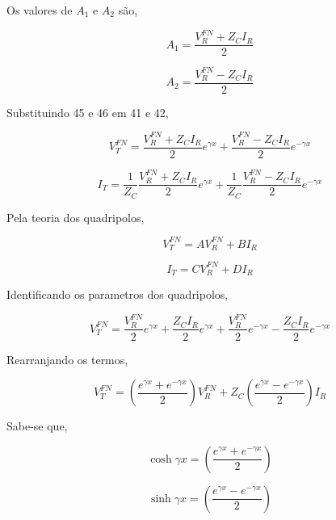 \documentclass[a4paper, 10pt]{article}
\begin{document}
Os valores de $A_1$ e $A_2$ são,

\begin{equation}
A_1 = \frac{V_R^{FN} +  Z_C I_R}{2}
\end{equation}

\begin{equation}
A_2 = \frac{V_R^{FN} -  Z_C I_R}{2}
\end{equation}

Substituindo 45 e 46 em 41 e 42,

\begin{equation}
V_T^{FN} = \frac{V_R^{FN} +  Z_C I_R}{2} e^{\gamma x} +   \frac{V_R^{FN} -  Z_C I_R}{2} e^{- \gamma x}
\end{equation}

\begin{equation}
I_T = \frac{1}{Z_C} \frac{V_R^{FN} +  Z_C I_R}{2} e^{\gamma x} +  \frac{1}{Z_C} \frac{V_R^{FN} -  Z_C I_R}{2} e^{- \gamma x}
\end{equation}

Pela teoria dos quadripolos,

\begin{equation}
V_T^{FN} = A V_R^{FN} + B I_R
\end{equation}

\begin{equation}
I_T = C V_R^{FN} + D I_R
\end{equation}

Identificando os parametros dos quadripolos,

\begin{equation}
V_T^{FN} = \frac{V_R^{FN}}{2} e^{\gamma x} + \frac{Z_C I_R}{2} e^{\gamma x} +  \frac{V_R^{FN}}{2} e^{-\gamma x} - \frac{Z_C I_R}{2} e^{-\gamma x}
\end{equation}

Rearranjando os termos,

\begin{equation}
V_T^{FN} = \left( \frac{e^{\gamma x} + e^{-\gamma x}}{2}\right) V_R^{FN} + Z_C \left( \frac{e^{\gamma x} - e^{-\gamma x}}{2}\right) I_R
\end{equation}

Sabe-se que,

\begin{equation}
\cosh{\gamma x} = \left( \frac{e^{\gamma x} + e^{-\gamma x}}{2}\right)
\end{equation}

\begin{equation}
\sinh{\gamma x} = \left( \frac{e^{\gamma x} - e^{-\gamma x}}{2}\right)
\end{equation}
\end{document}
